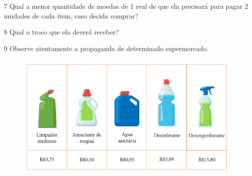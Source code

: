 \num{7} 
  Qual a menor quantidade de moedas de 1 real de que ela precisará para
  pagar 2 unidades de cada item, caso decida comprar?


\num{8} Qual o troco que ela deverá receber?


\pagebreak
\num{9} Observe atentamente a propaganda de determinado supermercado.

\begin{figure}[htpb!]
\includegraphics[width=\textwidth]{../ilustracoes/MAT5/SAEB_5ANO_MAT_figura55.png}
\end{figure}


